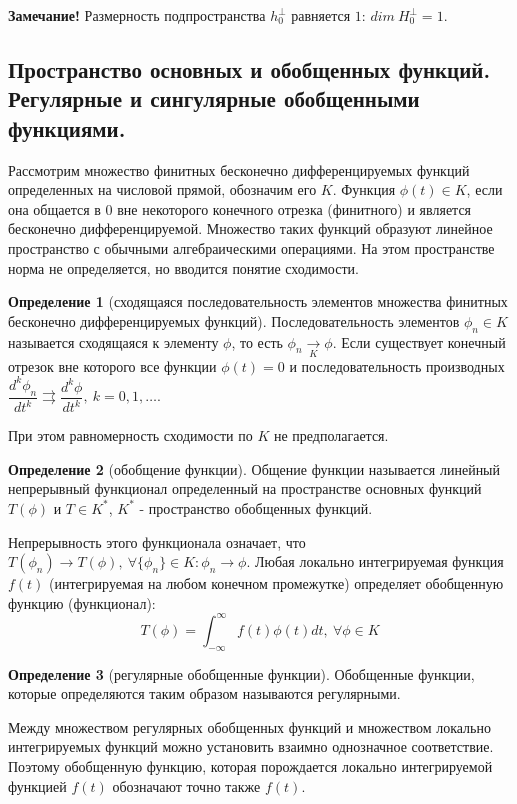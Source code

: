 \documentclass[14pt,a4paper]{extarticle}
\theoremstyle{definition}
\newtheorem{definition}{Определение}[section]
\theoremstyle{remark}
\renewcommand{\[}{\begin{dmath*}[compact]}
\renewcommand{\]}{\end{dmath*}}
\newcommand{\sep}{ , \ \allowbreak }
\newcommand\fr[2]{\dfrac{#1}{#2}}
\begin{document}
\textbf{Замечание!} Размерность подпространства $h_0^\bot$ равняется
$1$: $dim\ H_0^\bot = 1$.


\subsection{Пространство основных и обобщенных функций.
Регулярные и сингулярные обобщенными функциями.}

Рассмотрим множество финитных бесконечно дифференцируемых функций
определенных на числовой прямой, обозначим его $K$. Функция $\phi(t) \in K$,
если она общается в $0$ вне некоторого конечного отрезка (финитного) и
является бесконечно дифференцируемой.
Множество таких функций образуют линейное пространство с обычными
алгебраическими операциями.
На этом пространстве норма не определяется, но вводится понятие сходимости.

\begin{definition}[сходящаяся последовательность элементов множества
финитных бесконечно дифференцируемых функций]
  Последовательность элементов $\phi_n \in K$ называется сходящаяся к элементу
  $\phi$, то есть $\phi_n \underset{K}{\to}\phi$.
  Если существует конечный отрезок вне которого все функции $\phi(t)=0$ и
  последовательность производных
  $\fr{d^k\phi_n}{dt^k} \rightrightarrows \fr{d^k\phi}{dt^k} \sep k=0,1,\dots$.
\end{definition}

При этом равномерность сходимости по $K$ не предполагается.

\begin{definition}[обобщение функции]
  Общение функции называется линейный непрерывный функционал определенный
  на пространстве основных функций $T(\phi)$ и $T \in K^*$,
  $K^*$ - пространство обобщенных функций.
\end{definition}

Непрерывность этого функционала означает,
что $T(\phi_n) \to T(\phi) \sep \forall \{\phi_n\}\in K: \phi_n \to \phi$.
Любая локально интегрируемая функция $f(t)$
(интегрируемая на любом конечном промежутке) определяет
обобщенную функцию (функционал):
\[T(\phi)=\int_{-\infty}^\infty f(t)\phi(t)dt \sep \forall \phi \in K\]

\begin{definition}[регулярные обобщенные функции]
  Обобщенные функции, которые определяются таким образом называются регулярными.
\end{definition}

Между множеством регулярных обобщенных функций и множеством локально интегрируемых
функций можно установить взаимно однозначное соответствие.
Поэтому обобщенную функцию, которая порождается локально интегрируемой
функцией $f(t)$ обозначают точно также $f(t)$.
\end{document}
